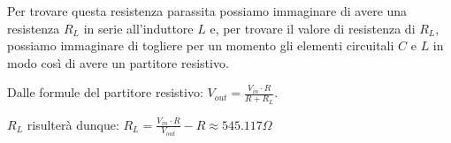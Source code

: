 \documentclass{article}
\begin{document}
Per trovare questa resistenza parassita possiamo immaginare di avere una resistenza $R_L$ in serie all'induttore $L$ e, per trovare il valore di resistenza di $R_L$, possiamo immaginare di togliere per un momento gli elementi circuitali $C$ e $L$ in modo così di avere un partitore resistivo.

Dalle formule del partitore resistivo: \(V_{out} = \frac{V_{in} \cdot R}{R + R_L}\).

$R_L$ risulterà dunque: \(R_L = \frac{V_{in} \cdot R }{V_{out}} - R \approx 545.117 \Omega \)
\end{document}
